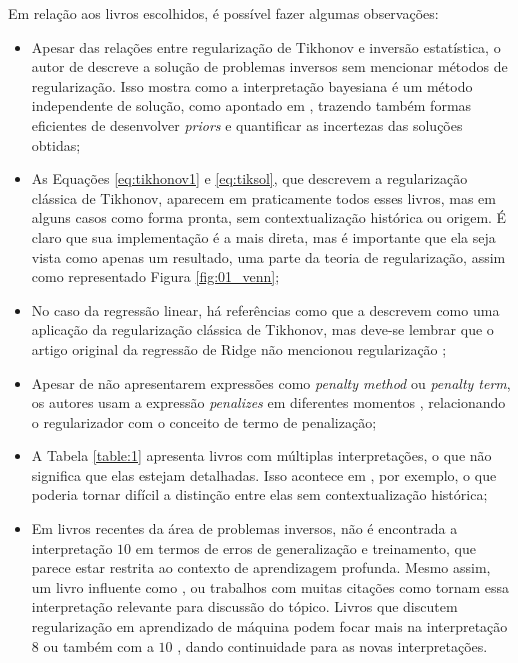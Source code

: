\vspace{2mm}

Em relação aos livros escolhidos, é possível fazer algumas observações:
\begin{itemize}

\item Apesar das relações entre regularização de Tikhonov e inversão estatística, o autor de \cite{tarantola2005inverse} descreve a solução de problemas inversos sem mencionar métodos de regularização. Isso mostra como a interpretação bayesiana é um método independente de solução, como apontado em \cite{Calvetti2018a}, trazendo também formas eficientes de desenvolver \textit{priors} e quantificar as incertezas das soluções obtidas;
 \item As Equações \eqref{eq:tikhonov1} e \eqref{eq:tiksol}, que descrevem a regularização clássica de Tikhonov, aparecem em praticamente todos esses livros, mas em alguns casos como forma pronta, sem contextualização histórica ou origem. É claro que sua implementação é a mais direta, mas é importante que ela seja vista como apenas um resultado, uma parte da teoria de regularização, assim como representado Figura \ref{fig:01_venn}; 
 \item No caso da regressão linear, há referências como \cite{Bertero2021, hansen2010discrete, tarantola2005inverse} que a descrevem como uma aplicação da regularização clássica de Tikhonov, mas deve-se lembrar que o artigo original da regressão de Ridge não mencionou regularização \cite{Hoerl1970};
\item Apesar de \cite{aster2019parameter, hansen2010discrete} não apresentarem expressões como \textit{penalty method} ou \textit{penalty term}, os autores usam a expressão \textit{penalizes} em diferentes momentos \cite[págs. 187, 190]{hansen2010discrete}, relacionando o regularizador com o conceito de termo de penalização;
 \item A Tabela \ref{table:1} apresenta livros com múltiplas interpretações, o que não significa que elas estejam detalhadas. Isso acontece em \cite{Deisenroth2020, alvarez2017digital}, por exemplo, o que poderia tornar difícil a distinção entre elas sem contextualização histórica; 
 \item Em livros recentes da área de problemas inversos, não é encontrada a interpretação $10$ em termos de erros de generalização e treinamento, que parece estar restrita ao contexto de aprendizagem profunda. Mesmo assim, um livro influente como \cite{goodfellow2016deep}, ou trabalhos com muitas citações como \cite{2017kukacka} tornam essa interpretação relevante para discussão do tópico. Livros que discutem regularização em aprendizado de máquina podem focar mais na interpretação $8$ \cite{Vandenbussche2023} ou também com a $10$ \cite{Peng2023}, dando continuidade para as novas interpretações.
\end{itemize}

